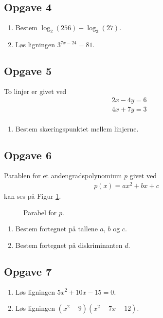 \subsection*{Opgave 4}
\begin{enumerate}[label=\roman*)]
	\item Bestem $\log_2(256) - \log_3(27).$
	\item Løs ligningen $3^{7x-24} = 81.$
\end{enumerate}

\subsection*{Opgave 5}
To linjer er givet ved
\begin{align*}
	&2x - 4y = 6\\
	&4x + 7y = 3\\
\end{align*}
\begin{enumerate}[label=\roman*)]
	\item Bestem skæringspunktet mellem linjerne. 
\end{enumerate}

\subsection*{Opgave 6}
Parablen for et andengradspolynomium $p$ givet ved
\begin{align*}
	p(x) = ax^2 + bx + c
\end{align*}
kan ses på Figur \ref{fig:parabel}.
\begin{figure}[h]
	\centering
	\caption{Parabel for $p$.}
	\label{fig:parabel}
\end{figure}
\begin{enumerate}[label=\roman*)]
	\item Bestem fortegnet på tallene $a$, $b$ og $c$. 
	\item Bestem fortegnet på diskriminanten $d$. 
\end{enumerate}

\subsection*{Opgave 7}
\begin{enumerate}[label=\roman*)]
	\item Løs ligningen $5x^2 + 10x - 15 = 0$. 
	\item Løs ligningen $(x^2-9)(x^2 - 7x -12)$.
\end{enumerate}

